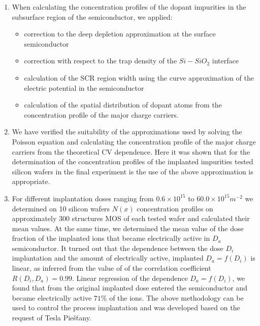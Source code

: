 \begin{enumerate}
\item When calculating the concentration profiles of the dopant
  impurities in the subsurface region of the semiconductor, we
  applied:

  \begin{itemize}
  \item correction to the deep depletion approximation at the surface
    semiconductor
  \item correction with respect to the trap density of the $Si-SiO_{2}$ interface
  \item calculation of the SCR region width using the curve approximation
    of the electric potential in the semiconductor
  \item calculation of the spatial distribution of dopant atoms from
    the concentration profile of the major charge carriers.
  \end{itemize}

\item We have verified the suitability of the approximations used by
  solving the Poisson equation and calculating the concentration
  profile of the major charge carriers from the theoretical CV
  dependence. Here it was shown that for the determination of the
  concentration profiles of the implanted impurities tested silicon
  wafers in the final experiment is the use of the above approximation
  is appropriate.

\item For different implantation doses ranging from $0.6 \times
  10^{15}$ to $60.0 \times 10^{15} m^{-2}$ we determined on 10 silicon
  wafers $N(x)$ concentration profiles on approximately 300 structures
  MOS of each tested wafer and calculated their mean values. At the
  same time, we determined the mean value of the dose fraction of the
  implanted ions that became electrically active in $D_{a}$
  semiconductor. It turned out that the dependence between the dose
  $D_{i}$ implantation and the amount of electrically active,
  implanted $D_{a}=f(D_{i})$ is linear, as inferred from the value of
  of the correlation coefficient $R(D_{i},D_{a})=0.99$.  Linear
  regression of the dependence $D_{a}=f(D_{i})$, we found that from
  the original implanted dose entered the semiconductor and became
  electrically active $71\%$ of the ions. The above methodology can be
  used to control the process implantation and was developed based on
  the request of Tesla Piešťany.


\end{enumerate}
